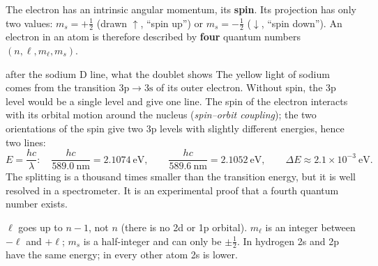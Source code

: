 \begin{concept}
The electron has an intrinsic angular momentum, its \textbf{spin}. Its projection has only two values:
$m_s = +\frac12$ (drawn $\uparrow$, ``spin up'') or $m_s = -\frac12$ ($\downarrow$, ``spin down'').
An electron in an atom is therefore described by \textbf{four} quantum numbers
$(n, \ell, m_\ell, m_s)$.
\end{concept}
\begin{handout}{after the sodium D line, what the doublet shows}
The yellow light of sodium comes from the transition $3\mathrm p\to3\mathrm s$ of its outer electron.
Without spin, the 3p level would be a single level and give one line. The spin of the electron interacts
with its orbital motion around the nucleus (\emph{spin--orbit coupling}); the two orientations of
the spin give two 3p levels with slightly different energies, hence two lines:
\[E = \frac{hc}{\lambda}:\quad \frac{hc}{589.0\ \mathrm{nm}} = 2.1074\ \mathrm{eV},\qquad
\frac{hc}{589.6\ \mathrm{nm}} = 2.1052\ \mathrm{eV},\qquad \Delta E \approx 2.1\times10^{-3}\ \mathrm{eV}.\]
The splitting is a thousand times smaller than the transition energy, but it is well resolved in a
spectrometer. It is an experimental proof that a fourth quantum number exists.
\end{handout}
\begin{trap}
$\ell$ goes up to $n - 1$, not $n$ (there is no 2d or 1p orbital). $m_\ell$ is an integer between
$-\ell$ and $+\ell$; $m_s$ is a half-integer and can only be $\pm\frac12$. In hydrogen 2s and 2p have the
same energy; in every other atom 2s is lower.
\end{trap}


